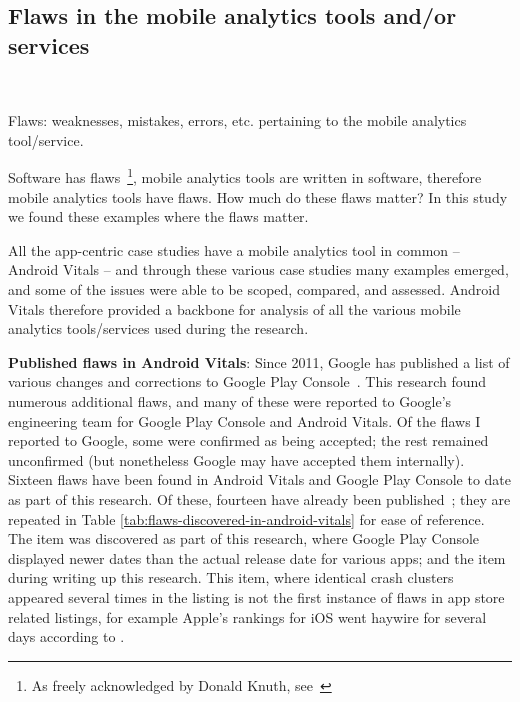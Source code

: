 \subsection{Flaws in the mobile analytics tools and/or services}~\label{section-flaws}

Flaws: weaknesses, mistakes, errors, etc. pertaining to the mobile analytics tool/service.

Software has flaws~\footnote{As freely acknowledged by Donald Knuth, see~\citep{ditlea1999_knuth_rewriting_the_bible_in_0s_and_1s}}, mobile analytics tools are written in software, therefore mobile analytics tools have flaws. %
How much do these flaws matter? In this study we found these examples where the flaws matter. 

All the app-centric case studies have a mobile analytics tool in common -- Android Vitals -- and through these various case studies many examples emerged, and some of the issues were able to be scoped, compared, and assessed. Android Vitals therefore provided a backbone for analysis of all the various mobile analytics tools/services used during the research.

\textbf{Published flaws in Android Vitals}: Since 2011, Google has published a list of various changes and corrections to Google Play Console~\citep{google_play_troubleshoot_app_statistics_problems}. This research found numerous additional flaws, and many of these were reported to Google's engineering team for Google Play Console and Android Vitals. Of the flaws I reported to Google, some were confirmed as being accepted; the rest remained unconfirmed (but nonetheless Google may have accepted them internally).  %
Sixteen flaws have been found in Android Vitals and Google Play Console to date as part of this research. Of these, fourteen have already been published~\citep{harty_improving_app_quality_despite_flawed_mobile_analytics, harty_google_play_console_insightful_development_using_android_vitals_and_pre_launch_reports, harty_better_android_apps_using_android_vitals}; they are repeated in Table \ref{tab:flaws-discovered-in-android-vitals} for ease of reference. The  item was discovered as part of this research, where Google Play Console displayed newer dates than the actual release date for various apps; and the  item during writing up this research. This  item, where identical crash clusters appeared several times in the listing is not the first instance of flaws in app store related listings, for example Apple's rankings for iOS went haywire for several days according to \citet{lotan2015_apple_apps_and_algorithmic_glitches}.


